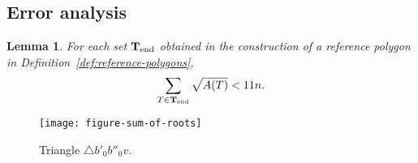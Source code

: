 \documentclass[11pt,english]{article}
\newtheorem{lemma}[theorem]{Lemma}
\numberwithin{figure}{section}
\newcommand{\Tend}{{\bf T}_{\text{end}}}
\begin{document}
\subsection{Error analysis}\label{sec:convexity-dist-approx-error-analysis}

\begin{lemma}\label{lem:sum-of-roots-of-areas}
For each set $\Tend$ obtained in the construction of a reference polygon in Definition~\ref{def:reference-polygons},
$$\sum_{T\in\Tend} \sqrt{A(T)}<11n.$$
\end{lemma}
\begin{figure}[ht]
\centering
\texttt{[image: figure-sum-of-roots]}
\caption{ Triangle $\bigtriangleup b'_0b''_0v$.}
\label{fig:sum-of-roots}
\end{figure}
\end{document}
